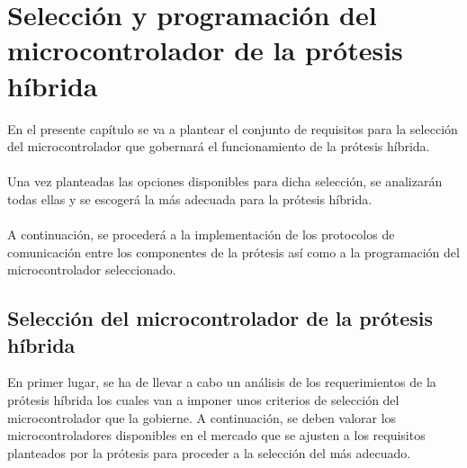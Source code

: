 \chapter{Selección y programación del microcontrolador de la prótesis híbrida}

En el presente capítulo se va a plantear el conjunto de requisitos para la selección del microcontrolador que gobernará el funcionamiento de la prótesis híbrida.
\\
\\
Una vez planteadas las opciones disponibles para dicha selección, se analizarán todas ellas y se escogerá la más adecuada para la prótesis híbrida.
\\
\\
A continuación, se procederá a la implementación de los protocolos de comunicación entre los componentes de la prótesis así como a la programación del microcontrolador seleccionado.

\section{Selección del microcontrolador de la prótesis híbrida}
En primer lugar, se ha de llevar a cabo un análisis de los requerimientos de la prótesis híbrida los cuales van a imponer unos criterios de selección del microcontrolador que la gobierne. A continuación, se deben valorar los microcontroladores disponibles en el mercado que se ajusten a los requisitos planteados por la prótesis para proceder a la selección del más adecuado.

